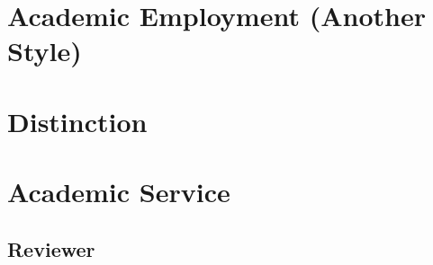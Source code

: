 \documentclass{article}
\newcommand{\cvsection}[1]{\section*{\rmfamily#1}}
\newcommand{\cvsubsection}[1]{\subsection*{\rmfamily\hspace{1.6em}#1}}
\begin{document}











\cvsection{Academic Employment (Another Style)}









\cvsection{Distinction}




\cvsection{Academic Service}

\cvsubsection{Reviewer}





\end{document}
